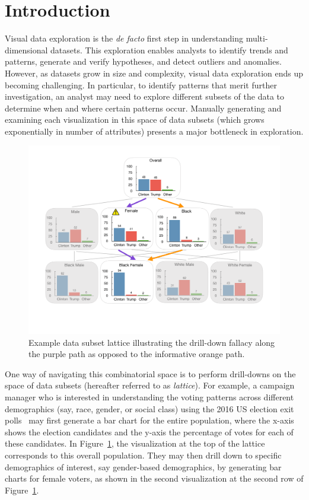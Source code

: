 \section{Introduction}
\par Visual data exploration is the \emph{de facto} first step in understanding multi-dimensional datasets. This exploration enables analysts to identify trends and patterns, generate and verify hypotheses, and detect outliers and anomalies. However, as datasets grow in size and complexity, visual data exploration ends up becoming challenging. In particular, to identify patterns that merit further investigation, an analyst may need to explore different subsets of the data to determine when and where certain patterns occur. Manually generating and examining each visualization in this space of data subsets (which grows exponentially in number of attributes) presents a major bottleneck in exploration.
\begin{figure}[ht!]
\includegraphics[width=\linewidth]{figures/elections_example_lattice_teaser.pdf}
\caption{Example data subset lattice illustrating the drill-down fallacy along the purple path as opposed to the informative orange path.}
\label{fig:elections_example}
\end{figure}
\par One way of navigating this combinatorial space is to perform drill-downs on the space of data subsets (hereafter referred to as \emph{lattice}). For example, a campaign manager who is interested in understanding the voting patterns across different demographics (say, race, gender, or social class) using the 2016 US election exit polls~\cite{exitpolls} may first generate a bar chart for the entire population, where the x-axis shows the election candidates and the y-axis the percentage of votes for each of these candidates. In Figure~\ref{fig:elections_example}, the visualization at the top of the lattice corresponds to this overall population. They may then drill down to specific demographics of interest, say gender-based demographics, by generating bar charts for female voters, as shown in the second visualization at the second row of Figure~\ref{fig:elections_example}.

